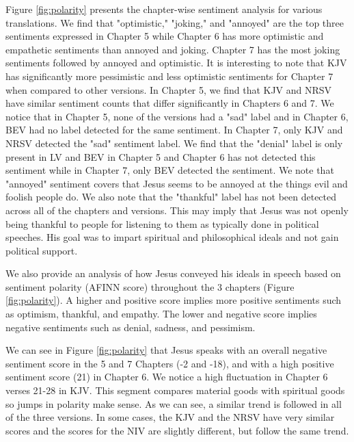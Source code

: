 \documentclass[5p,times]{elsarticle}
\begin{document}
 
Figure \ref{fig:polarity} presents the chapter-wise sentiment analysis for various translations. We find that "optimistic," "joking," and "annoyed" are the top three sentiments expressed in Chapter 5 while Chapter 6 has more optimistic and empathetic sentiments than annoyed and joking. Chapter 7 has the most joking sentiments followed by annoyed and optimistic. It is interesting to note that KJV has significantly more pessimistic and less optimistic sentiments for Chapter 7 when compared to other versions. In Chapter 5, we find that KJV and NRSV have similar sentiment counts that differ significantly in Chapters 6 and 7.  We notice that in Chapter 5, none of the versions had a "sad" label and in Chapter 6, BEV had no label detected for the same sentiment. In Chapter 7, only KJV and NRSV detected the "sad" sentiment label. We find that the "denial" label is only present in LV and BEV in Chapter 5 and Chapter 6 has not detected this sentiment while in Chapter 7, only BEV detected the sentiment.  We note that "annoyed" sentiment covers that Jesus seems to be annoyed at the things evil and foolish people do. We also note that the "thankful" label has not been detected across all of the chapters and versions. This may imply that Jesus was not openly being thankful to people for listening to them as typically done in political speeches. His goal was to impart spiritual and philosophical ideals and not gain political support.

We also provide an analysis of how Jesus conveyed his ideals in speech based on sentiment polarity (AFINN score) throughout the 3 chapters (Figure \ref{fig:polarity}). A higher and positive score implies more positive sentiments such as optimism, thankful, and empathy. The lower and negative score implies negative sentiments such as denial, sadness, and pessimism. 
 

We can see in Figure \ref{fig:polarity} that Jesus speaks with an overall negative sentiment score in the 5 and 7 Chapters (-2 and -18), and with a high positive sentiment score (21) in Chapter 6. We notice a high fluctuation in Chapter 6 verses 21-28 in KJV. This segment compares material goods with spiritual goods so jumps in polarity make sense.
As we can see, a similar trend is followed in all of the three versions. In some cases, the KJV and the NRSV have very similar scores and the scores for the NIV are slightly different, but follow the same trend.  %


 
\end{document}
